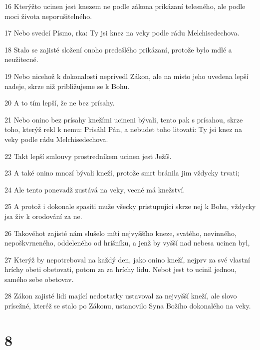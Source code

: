 \par 16 Kterýžto ucinen jest knezem ne podle zákona prikázaní telesného, ale podle moci života neporušitelného.
\par 17 Nebo svedcí Písmo, rka: Ty jsi knez na veky podle rádu Melchisedechova.
\par 18 Stalo se zajisté složení onoho predešlého prikázaní, protože bylo mdlé a neužitecné.
\par 19 Nebo nicehož k dokonalosti neprivedl Zákon, ale na místo jeho uvedena lepší nadeje, skrze niž približujeme se k Bohu.
\par 20 A to tím lepší, že ne bez prísahy.
\par 21 Nebo onino bez prísahy knežími ucineni bývali, tento pak s prísahou, skrze toho, kterýž rekl k nemu: Prisáhl Pán, a nebudet toho litovati: Ty jsi knez na veky podle rádu Melchisedechova.
\par 22 Takt lepší smlouvy prostredníkem ucinen jest Ježíš.
\par 23 A také onino mnozí bývali kneží, protože smrt bránila jim vždycky trvati;
\par 24 Ale tento ponevadž zustává na veky, vecné má knežství.
\par 25 A protož i dokonale spasiti muže všecky pristupující skrze nej k Bohu, vždycky jsa živ k orodování za ne.
\par 26 Takovéhot zajisté nám slušelo míti nejvyššího kneze, svatého, nevinného, nepoškvrneného, oddeleného od hríšníku, a jenž by vyšší nad nebesa ucinen byl,
\par 27 Kterýž by nepotreboval na každý den, jako onino kneží, nejprv za své vlastní hríchy obeti obetovati, potom za za hríchy lidu. Nebot jest to ucinil jednou, samého sebe obetovav.
\par 28 Zákon zajisté lidi mající nedostatky ustavoval za nejvyšší kneží, ale slovo prísežné, kteréž se stalo po Zákonu, ustanovilo Syna Božího dokonalého na veky.

\chapter{8}

